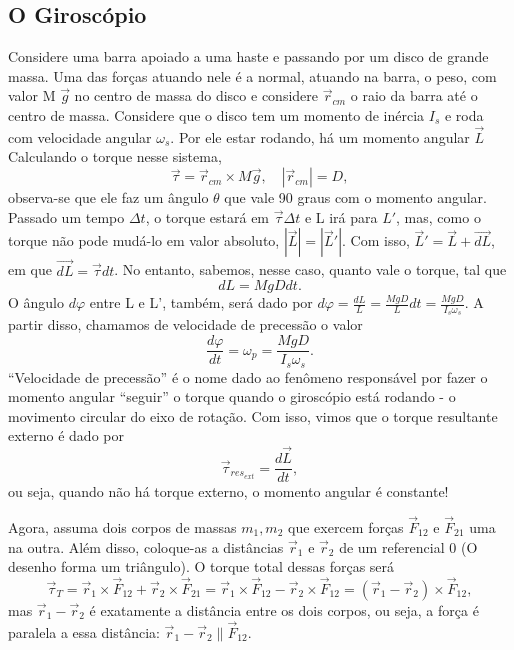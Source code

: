 \documentclass{article}
\begin{document}
\subsection{O Giroscópio}
Considere uma barra apoiado a uma haste e passando por um disco de grande massa. Uma das forças atuando nele é a normal, atuando na barra, o peso, com valor M \(\vec{g}\) no centro de massa do disco
e considere \(\vec{r}_{cm}\) o raio da barra até o centro de massa. Considere que o disco tem um momento de inércia \(I_{s}\) e roda com velocidade angular \(\omega_{s}\). Por ele estar rodando,
há um momento angular \(\vec{L}\)
Calculando o torque nesse sistema, 
\[
  \vec{\tau } = \vec{r}_{cm}\times M \vec{g},\quad |\vec{r}_{cm}| = D,
\]
observa-se que ele faz um ângulo \(\theta\) que vale 90 graus com o momento angular. Passado um tempo \(\Delta t\), o torque estará
em \(\vec{\tau }\Delta t\) e L irá para \(L'\), mas, como o torque não pode mudá-lo em valor absoluto, \(|\vec{L}|=|\vec{L}'|\). Com isso, \(\vec{L}' = \vec{L} + \vec{dL}\),
em que \(\vec{dL} = \vec{\tau} dt\). No entanto, sabemos, nesse caso, quanto vale o torque, tal que 
\[
  dL = MgDdt.
\]
O ângulo \(d\varphi \) entre L e L', também, será dado por \(d\varphi = \frac{dL}{L} = \frac{MgD}{L}dt = \frac{MgD}{I_{s}\omega_{s}}.\) A partir disso,
chamamos de velocidade de precessão o valor 
\[
  \frac{d\varphi }{dt}= \omega_{p} = \frac{MgD}{I_{s}\omega_{s}}.
\]
``Velocidade de precessão'' é o nome dado ao fenômeno responsável por fazer o momento angular ``seguir'' o torque quando o giroscópio está rodando - o movimento circular do eixo de rotação. Com isso,
vimos que o torque resultante externo é dado por 
\[
  \vec{\tau }_{res_{ext}} = \frac{d \vec{L}}{dt},
\]
ou seja, quando não há torque externo, o momento angular é constante!

Agora, assuma dois corpos de massas \(m_{1}, m_{2}\) que exercem forças \(\vec{F}_{12}\) e \(\vec{F}_{21}\) uma na outra. Além disso, coloque-as
a distâncias \(\vec{r}_{1}\) e \(\vec{r}_{2}\) de um referencial 0 (O desenho forma um triângulo). O torque total dessas forças será 
\[
  \vec{\tau}_{T} = \vec{r}_{1}\times \vec{F}_{12} + \vec{r}_{2}\times \vec{F}_{21} = \vec{r}_{1}\times \vec{F}_{12}- \vec{r}_{2}\times \vec{F}_{12} = (\vec{r}_{1}-\vec{r}_{2})\times \vec{F}_{12},
\]
mas \(\vec{r}_{1}-\vec{r}_{2}\) é exatamente a distância entre os dois corpos, ou seja, a força é paralela a essa distância: \(\vec{r}_{1}-\vec{r}_{2}\parallel \vec{F}_{12}.\) 
\end{document}
